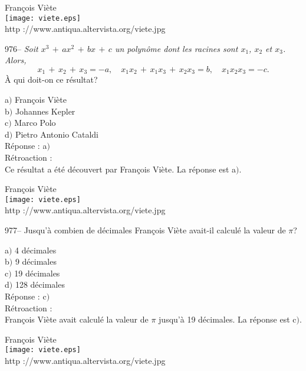 ﻿\documentclass[letterpaper, 12pt]{article}
\begin{document}
        \begin{center}
        Fran\c cois Vi\`ete\\
    \texttt{[image: viete.eps]}\\
        {\footnotesize http ://www.antiqua.altervista.org/viete.jpg}
    \end{center}

976-- {\sl Soit $x^3\,+\,ax^2\,+\,bx\,+\,c$ un polyn\^ome dont les
racines sont $x_1$, $x_2$ et $x_3$. Alors,
$$x_1\,+\,x_2\,+\,x_3=-a,\quad x_1x_2\,+\,x_1x_3\,+\,x_2x_3=b,\quad
x_1x_2x_3=-c.$$}
\`A qui doit-on ce r\'esultat?

a$)$ Fran\c cois Vi\`ete \\
b$)$ Johannes Kepler  \\
c$)$ Marco Polo  \\
d$)$ Pietro Antonio Cataldi\\

R\'eponse : a$)$\\

R\'etroaction : \\
Ce r\'esultat a \'et\'e d\'ecouvert par Fran\c cois Vi\`ete. La
r\'eponse est a$)$.

        \begin{center}
        Fran\c cois Vi\`ete\\
    \texttt{[image: viete.eps]}\\
        {\footnotesize http ://www.antiqua.altervista.org/viete.jpg}
    \end{center}

977-- Jusqu'\`a combien de d\'ecimales Fran\c cois Vi\`ete avait-il
calcul\'e la valeur de $\pi$?

a$)$ 4 d\'ecimales\\
b$)$ 9 d\'ecimales \\
c$)$ 19 d\'ecimales \\
d$)$ 128 d\'ecimales\\

R\'eponse : c$)$\\

R\'etroaction : \\
Fran\c cois Vi\`ete avait calcul\'e la valeur de $\pi$ jusqu'\`a 19
d\'ecimales. La r\'eponse est c$)$.

        \begin{center}
        Fran\c cois Vi\`ete\\
    \texttt{[image: viete.eps]}\\
        {\footnotesize http ://www.antiqua.altervista.org/viete.jpg}
    \end{center}
\end{document}
